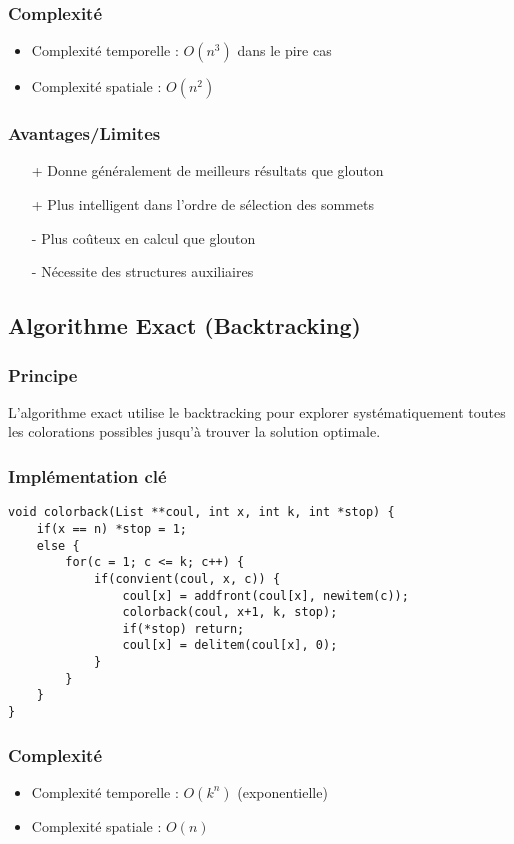 \documentclass[a4paper,11pt]{article}
\begin{document}
\subsubsection{Complexité}
\begin{itemize}
\item Complexité temporelle : $O(n^3)$ dans le pire cas
\item Complexité spatiale : $O(n^2)$
\end{itemize}

\subsubsection{Avantages/Limites}
\begin{itemize}
\item [+] Donne généralement de meilleurs résultats que glouton
\item [+] Plus intelligent dans l'ordre de sélection des sommets
\item [-] Plus coûteux en calcul que glouton
\item [-] Nécessite des structures auxiliaires
\end{itemize}

\subsection{Algorithme Exact (Backtracking)}
\subsubsection{Principe}
L'algorithme exact utilise le backtracking pour explorer systématiquement toutes les colorations possibles jusqu'à trouver la solution optimale.

\subsubsection{Implémentation clé}
\begin{verbatim}
void colorback(List **coul, int x, int k, int *stop) {
    if(x == n) *stop = 1;
    else {
        for(c = 1; c <= k; c++) {
            if(convient(coul, x, c)) {
                coul[x] = addfront(coul[x], newitem(c));
                colorback(coul, x+1, k, stop);
                if(*stop) return;
                coul[x] = delitem(coul[x], 0);
            }
        }
    }
}
\end{verbatim}

\subsubsection{Complexité}
\begin{itemize}
\item Complexité temporelle : $O(k^n)$ (exponentielle)
\item Complexité spatiale : $O(n)$
\end{itemize}
\end{document}
